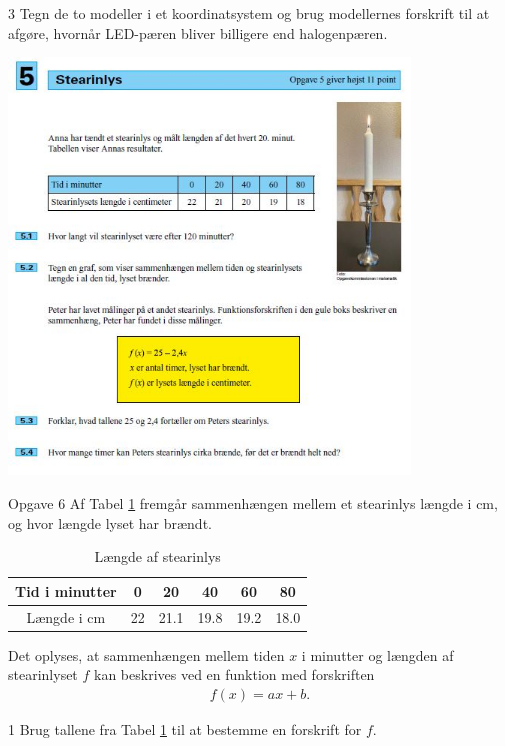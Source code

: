 \begin{delopgave}{}{3}
	Tegn de to modeller i et koordinatsystem og brug modellernes forskrift til at afgøre, 
	hvornår LED-pæren bliver billigere end halogenpæren. 
\end{delopgave}

\newpage

\begin{center}
	\includegraphics[width = 0.8\textwidth]{Billeder/opg6fskhj}
\end{center}

\begin{opgavetekst}{Opgave 6}
	Af Tabel \ref{tab:stearin} fremgår sammenhængen mellem et stearinlys længde i cm, 
	og hvor længde lyset har brændt.
	\begin{table}[H]
		\centering		
		\begin{tabular}{c|c|c|c|c|c}
		Tid i minutter & 0 & 20 & 40 & 60 & 80\\
		\hline
		Længde i cm & 22 & 21.1 & 19.8 & 19.2 & 18.0	
		\end{tabular}	
		\caption{Længde af stearinlys}
		\label{tab:stearin}
	\end{table}
	Det oplyses, at sammenhængen mellem tiden $x$ i minutter og længden af stearinlyset $f$ kan 
	beskrives ved en funktion med forskriften
	\begin{align*}
		f(x) = ax + b.
	\end{align*}
\end{opgavetekst}

\begin{delopgave}{}{1}
	Brug tallene fra Tabel \ref{tab:stearin} til at bestemme en forskrift for $f$. 
\end{delopgave}

